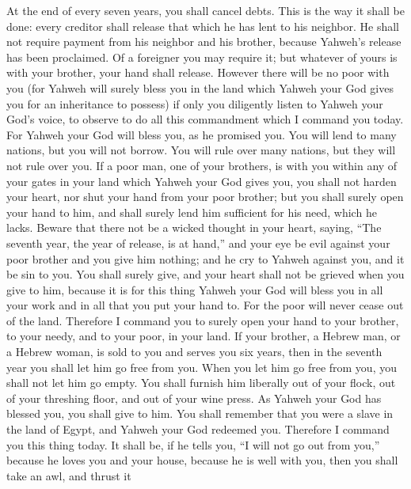  At the end of every seven years, you shall cancel debts.
 This is the way it shall be done: every creditor shall
release that which he has lent to his neighbor. He shall not require
payment from his neighbor and his brother, because Yahweh's release has
been proclaimed.  Of a foreigner you may require it; but
whatever of yours is with your brother, your hand shall release.
 However there will be no poor with you (for Yahweh will
surely bless you in the land which Yahweh your God gives you for an
inheritance to possess)  if only you diligently listen to
Yahweh your God's voice, to observe to do all this commandment which I
command you today.  For Yahweh your God will bless you, as
he promised you. You will lend to many nations, but you will not borrow.
You will rule over many nations, but they will not rule over you.
 If a poor man, one of your brothers, is with you within any
of your gates in your land which Yahweh your God gives you, you shall
not harden your heart, nor shut your hand from your poor brother;
 but you shall surely open your hand to him, and shall
surely lend him sufficient for his need, which he lacks. 
Beware that there not be a wicked thought in your heart, saying, ``The
seventh year, the year of release, is at hand,'' and your eye be evil
against your poor brother and you give him nothing; and he cry to Yahweh
against you, and it be sin to you.  You shall surely give,
and your heart shall not be grieved when you give to him, because it is
for this thing Yahweh your God will bless you in all your work and in
all that you put your hand to.  For the poor will never
cease out of the land. Therefore I command you to surely open your hand
to your brother, to your needy, and to your poor, in your land.
 If your brother, a Hebrew man, or a Hebrew woman, is sold
to you and serves you six years, then in the seventh year you shall let
him go free from you.  When you let him go free from you,
you shall not let him go empty.  You shall furnish him
liberally out of your flock, out of your threshing floor, and out of
your wine press. As Yahweh your God has blessed you, you shall give to
him.  You shall remember that you were a slave in the land
of Egypt, and Yahweh your God redeemed you. Therefore I command you this
thing today.  It shall be, if he tells you, ``I will not go
out from you,'' because he loves you and your house, because he is well
with you,  then you shall take an awl, and thrust it
